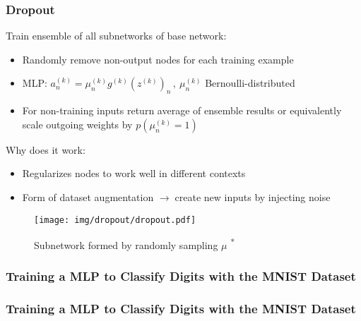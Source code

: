 \documentclass{beamer}
\newcommand{\arrow}{$\rightarrow\;$}
\renewcommand{\k}[2]{#1^{(#2)}}
\begin{document}
\begin{frame}
    \frametitle{Dropout}
    Train ensemble of all subnetworks of base network:
    \begin{itemize}
        \item Randomly remove non-output nodes for each training example
        \item MLP: $\k{a}{k}_n = \k{\mu}{k}_n \k{g}{k}(\k{z}{k})_n\,, \ \k{\mu}{k}_n$ Bernoulli-distributed
        \item For non-training inputs return average of ensemble results or
        equivalently scale outgoing weights by $p(\k{\mu}{k}_n = 1)$
    \end{itemize}
    \vspace{-0.5cm}
    \begin{minipage}{0.49\textwidth}
        \vspace{0.3cm}
        Why does it work:
        \begin{itemize}
            \item Regularizes nodes to work well in different contexts
            \item Form of dataset augmentation
            \arrow create new inputs by injecting noise
        \end{itemize}
    \end{minipage}
    \hspace{1em}
    \begin{minipage}{0.4\textwidth}
        \vspace{1cm}
        \begin{figure}
            \texttt{[image: img/dropout/dropout.pdf]}
            
            \caption{Subnetwork formed by randomly sampling $\mu$ \cite{dropout}\textsuperscript{*}}
        \end{figure}
    \end{minipage}
\end{frame}

\begin{frame}
    \frametitle{Training a MLP to Classify Digits with the MNIST Dataset}

\end{frame}

\begin{frame}
    \frametitle{Training a MLP to Classify Digits with the MNIST Dataset}
    
\end{frame}
\end{document}
